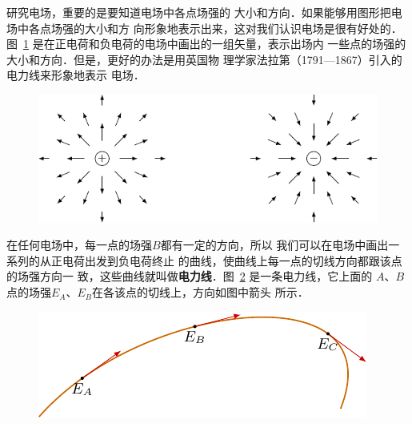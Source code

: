 研究电场，重要的是要知道电场中各点场强的
大小和方向．如果能够用图形把电场中各点场强的大小和方
向形象地表示出来，这对我们认识电场是很有好处的．图~\ref{fig_B_6-6} 
是在正电荷和负电荷的电场中画出的一组矢量，表示出场内
一些点的场强的大小和方向．但是，更好的办法是用英国物
理学家法拉第（1791—1867）引入的电力线来形象地表示
电场．
\begin{figure}[htbp]
    \centering
    \includegraphics{fig/B/6-6.pdf}
    \caption{}\label{fig_B_6-6}
\end{figure}

在任何电场中，每一点的场强$B$都有一定的方向，所以
我们可以在电场中画出一系列的从正电荷出发到负电荷终止
的曲线，使曲线上每一点的切线方向都跟该点的场强方向一
致，这些曲线就叫做\textbf{电力线}．图~\ref{fig_B_6-7} 是一条电力线，它上面的
$A$、$B$点的场强$E_A$、$E_B$在各该点的切线上，方向如图中箭头
所示．
\begin{figure}[htbp]
    \centering
    \includegraphics{fig/B/6-7.pdf}
    \caption{}\label{fig_B_6-7}
\end{figure}

